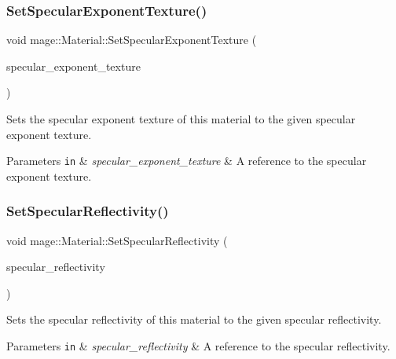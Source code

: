 \subsubsection{\texorpdfstring{Set\+Specular\+Exponent\+Texture()}{SetSpecularExponentTexture()}}
{\footnotesize\ttfamily void mage\+::\+Material\+::\+Set\+Specular\+Exponent\+Texture (\begin{DoxyParamCaption}\item[{\hyperlink{namespacemage_a1e01ae66713838a7a67d30e44c67703e}{Shared\+Ptr}$<$ \hyperlink{classmage_1_1_texture}{Texture} $>$}]{specular\+\_\+exponent\+\_\+texture }\end{DoxyParamCaption})}

Sets the specular exponent texture of this material to the given specular exponent texture.


\begin{DoxyParams}[1]{Parameters}
\mbox{\tt in}  & {\em specular\+\_\+exponent\+\_\+texture} & A reference to the specular exponent texture. \\
\hline
\end{DoxyParams}
\hypertarget{structmage_1_1_material_ac615e33c8e17149345488fed5c16dc7b}{}\label{structmage_1_1_material_ac615e33c8e17149345488fed5c16dc7b} 
\subsubsection{\texorpdfstring{Set\+Specular\+Reflectivity()}{SetSpecularReflectivity()}\hspace{0.1cm}{\footnotesize\ttfamily [1/2]}}
{\footnotesize\ttfamily void mage\+::\+Material\+::\+Set\+Specular\+Reflectivity (\begin{DoxyParamCaption}\item[{const \hyperlink{structmage_1_1_r_g_b_spectrum}{R\+G\+B\+Spectrum} \&}]{specular\+\_\+reflectivity }\end{DoxyParamCaption})\hspace{0.3cm}{\ttfamily [noexcept]}}

Sets the specular reflectivity of this material to the given specular reflectivity.


\begin{DoxyParams}[1]{Parameters}
\mbox{\tt in}  & {\em specular\+\_\+reflectivity} & A reference to the specular reflectivity. \\
\hline
\end{DoxyParams}
\hypertarget{structmage_1_1_material_ade7fe7386618bd139e9c43699eba0a20}{}\label{structmage_1_1_material_ade7fe7386618bd139e9c43699eba0a20} 
